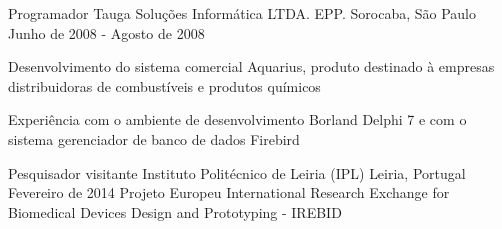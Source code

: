 \begin{cventries}
    \cventry
    {Programador}
    {Tauga Soluções Informática LTDA. EPP.}
    {Sorocaba, São Paulo}
    {Junho de 2008 - Agosto de 2008}
    {
      \begin{cvitems}
      \item{Desenvolvimento do sistema comercial Aquarius, produto destinado à empresas distribuidoras de combustíveis e produtos químicos}
      \item {Experiência com o ambiente de desenvolvimento Borland Delphi 7 e com o sistema gerenciador de banco de dados Firebird}
      \end{cvitems}
    }

  \end{cventries}


\begin{cventries}

  \cventry
    {Pesquisador visitante}
    {Instituto Politécnico de Leiria (IPL)}
    {Leiria, Portugal}
    {Fevereiro de 2014}
    {Projeto Europeu International Research Exchange for Biomedical Devices Design and Prototyping - IREBID}
  \end{cventries}
